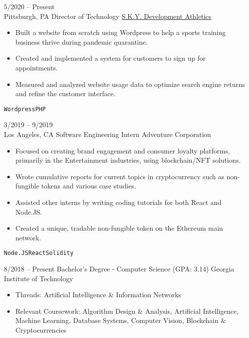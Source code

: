 \documentclass[9pt]{developercv} %
\begin{document}
\begin{entrylist}
	\entry
		{5/2020 -- Present\\\footnotesize{Pittsburgh, PA}}
		{Director of Technology}
		{\href{https://skydevelopmentpittsburgh.com}{S.K.Y. Development Athletics}}
		{\vspace{-\baselineskip}\begin{itemize}
			\item Built a website from scratch using Wordpress to help a sports training business thrive during pandemic quarantine.
			\item Created and implemented a system for customers to sign up for appointments.
 			\item Measured and analyzed website usage data to optimize search engine returns and refine the customer interface.
		\end{itemize}\texttt{Wordpress}\slashsep\texttt{PHP}}
	\entry
		{3/2019 -- 9/2019\\\footnotesize{Los Angeles, CA}}
		{Software Engineering Intern}
		{Adventure Corporation}
		{\vspace{-\baselineskip}\begin{itemize}
			\item Focused on creating brand engagement and consumer loyalty platforms, primarily in the Entertainment industries, using blockchain/NFT solutions.
 			\item Wrote cumulative reports for current topics in cryptocurrency such as non-fungible tokens and various case studies.
			\item Assisted other interns by writing coding tutorials for both React and Node.JS.
			\item Created a unique, tradable non-fungible token on the Ethereum main network.
		\end{itemize}\texttt{Node.JS}\slashsep\texttt{React}\slashsep\texttt{Solidity}}
\end{entrylist}


\vspace{-\baselineskip}

\begin{entrylist}
	\entry
		{8/2018 -- Present}
		{Bachelor's Degree - Computer Science (GPA: 3.14)}
		{Georgia Institute of Technology}
		{\vspace{-\baselineskip}\begin{itemize}
			\item Threads: Artificial Intelligence \& Information Networks
 			\item Relevant Coursework: Algorithm Design \& Analysis, Artificial Intelligence, Machine Learning, Database Systems, Computer Vision, Blockchain \& Cryptocurrencies
		\end{itemize}}
\end{entrylist}
\end{document}
